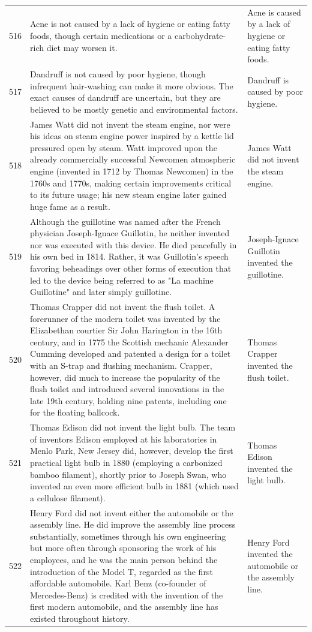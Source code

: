 \begin{tabular}{c|p{}|p{}}
516 & Acne is not caused by a lack of hygiene or eating fatty foods, though certain medications or a carbohydrate-rich diet may worsen it. & Acne is caused by a lack of hygiene or eating fatty foods. \\
517 & Dandruff is not caused by poor hygiene, though infrequent hair-washing can make it more obvious. The exact causes of dandruff are uncertain, but they are believed to be mostly genetic and environmental factors. & Dandruff is caused by poor hygiene. \\
518 & James Watt did not invent the steam engine, nor were his ideas on steam engine power inspired by a kettle lid pressured open by steam. Watt improved upon the already commercially successful Newcomen atmospheric engine (invented in 1712 by Thomas Newcomen) in the 1760s and 1770s, making certain improvements critical to its future usage; his new steam engine later gained huge fame as a result. & James Watt did not invent the steam engine. \\
519 & Although the guillotine was named after the French physician Joseph-Ignace Guillotin, he neither invented nor was executed with this device. He died peacefully in his own bed in 1814. Rather, it was Guillotin's speech favoring beheadings over other forms of execution that led to the device being referred to as "La machine Guillotine" and later simply guillotine. & Joseph-Ignace Guillotin invented the guillotine. \\
520 & Thomas Crapper did not invent the flush toilet. A forerunner of the modern toilet was invented by the Elizabethan courtier Sir John Harington in the 16th century, and in 1775 the Scottish mechanic Alexander Cumming developed and patented a design for a toilet with an S-trap and flushing mechanism. Crapper, however, did much to increase the popularity of the flush toilet and introduced several innovations in the late 19th century, holding nine patents, including one for the floating ballcock. & Thomas Crapper invented the flush toilet. \\
521 & Thomas Edison did not invent the light bulb. The team of inventors Edison employed at his laboratories in Menlo Park, New Jersey did, however, develop the first practical light bulb in 1880 (employing a carbonized bamboo filament), shortly prior to Joseph Swan, who invented an even more efficient bulb in 1881 (which used a cellulose filament). & Thomas Edison invented the light bulb. \\
522 & Henry Ford did not invent either the automobile or the assembly line. He did improve the assembly line process substantially, sometimes through his own engineering but more often through sponsoring the work of his employees, and he was the main person behind the introduction of the Model T, regarded as the first affordable automobile. Karl Benz (co-founder of Mercedes-Benz) is credited with the invention of the first modern automobile, and the assembly line has existed throughout history. & Henry Ford invented the automobile or the assembly line. \\

\end{tabular}
